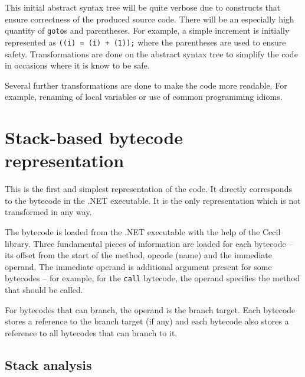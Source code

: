 \documentclass[12pt,twoside,notitlepage]{report}
\begin{document}


This initial abstract syntax tree will be quite verbose due to
constructs that ensure correctness of the produced source code.
There will be an especially high quantity of \verb|goto|s and
parentheses.  For example, a simple increment is initially
represented as \verb|((i) = (i) + (1));| where the parentheses
are used to ensure safety.
Transformations are done on the abstract syntax tree to simplify the code
in occasions where it is know to be safe.

Several further transformations are done to make the code more readable.
For example, renaming of local variables or use of common 
programming idioms.

\section{Stack-based bytecode representation}
  \label{Stack-based bytecode representation}

This is the first and simplest representation of the code.
It directly corresponds to the bytecode in the .NET executable.
It is the only representation which is not transformed in any way.

The bytecode is loaded from the .NET executable with the 
help of the Cecil library. 
Three fundamental pieces of information are loaded for each bytecode -- 
its offset from the start of the method, opcode
(name) and the immediate operand.  
The immediate operand is additional argument
present for some bytecodes -- for example, for the \verb|call| bytecode,
the operand specifies the method that should be called.

For bytecodes that can branch, the operand is the branch target.
Each bytecode stores a reference to the branch target (if any) and
each bytecode also stores a reference to all bytecodes that can branch to it.

\subsection{Stack analysis}
\end{document}
